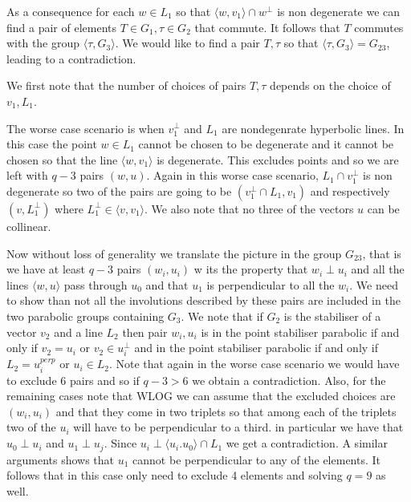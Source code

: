 \documentclass[12pt]{amsart}
\theoremstyle{definition}
\begin{document}
As a consequence for each $w \in L_{1}$ so that $\langle w , v_{1}\rangle \cap w^{\perp}$ is non degenerate we can find a pair of elements $T \in G_{1}, \tau \in G_{2}$ that commute. It follows that $T$ commutes with the group $\langle \tau, G_{3}\rangle$. We would like to find a pair $T, \tau$ so that $\langle \tau, G_{3}\rangle = G_{23}$, leading to a contradiction.

We first note that the number of choices of pairs $T, \tau$ depends on the choice of $v_{1}, L_{1}$. 

The worse case scenario is when $v_{1}^{\perp}$ and $L_{1}$ are  nondegenrate hyperbolic lines. In this case the point $w \in L_1$ cannot be chosen to be degenerate and  it cannot be chosen so that the line $\langle w, v_{1}\rangle$ is degenerate. This excludes  points and so we are left with $q-3$ pairs $(w, u)$. Again in this worse case scenario, $L_{1}\cap v_{1}^{\perp}$ is non degenerate so two of the pairs are going to be $(v_{1}^{\perp}\cap L_1, v_{1})$ and respectively $(v , L_{1}^{\perp})$ where $L_{1}^{\perp} \in \langle v, v_{1}\rangle$. We also note that no three of the vectors $u$ can be collinear.

Now without loss of generality we translate the picture in the group $G_{23}$, that is we have at least $q-3$ pairs $(w_{i},u_{i})$ w its the property that $w_{i}\perp u_{i}$ and all the lines $\langle w, u\rangle $ pass through $u_{0}$ and that $u_{1}$ is perpendicular to all the $w_{i}$. We need to show than not all the involutions described by these pairs are included in the two parabolic groups containing $G_{3}$. We note that if $G_{2}$ is the stabiliser of a vector $v_{2}$ and a line  $L_{2}$ then pair $w_{i}, u_{i}$ is in the point stabiliser parabolic if and only if $v_{2}= u_{i}$ or $v_{2} \in u_{i}^{\perp}$ and in the point stabiliser parabolic if and only if $L_{2} = u_{i}^{perp}$ or $u_{i} \in L_{2}$. Note that again in the worse case scenario we would have to exclude 6 pairs and so if $q-3>6$ we obtain a contradiction.  Also, for the remaining cases note that WLOG we can assume that the excluded choices are $(w_{i}, u_{i})$ and that they come in two triplets so that among each of the triplets two of the $u_{i}$ will have to be perpendicular to a third. in particular we have that $u_{0}\perp u_{i}$ and $u_{1}\perp u_{j}$. Since $u_{i} \perp \langle u_{i}. u_{0}\rangle  \cap L_{1}$ we get a contradiction. A similar arguments shows that $u_{1}$ cannot be perpendicular to any of the elements. It follows that in this case only need to exclude 4 elements and solving $q=9$ as well.
\end{document}
